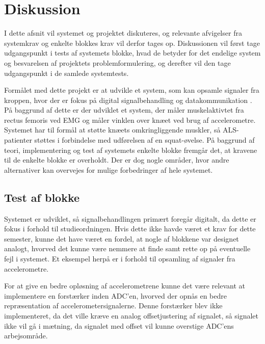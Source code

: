 \section{Diskussion} \label{sec:diskussion}
I dette afsnit vil systemet og projektet diskuteres, og relevante afvigelser fra systemkrav og enkelte blokkes krav vil derfor tages op. Diskussionen vil først tage udgangspunkt i tests af systemets blokke, hvad de betyder for det endelige system og besvarelsen af projektets problemformulering, og derefter vil den tage udgangspunkt i de samlede systemtests. 

Formålet med dette projekt er at udvikle et system, som kan opsamle signaler fra kroppen, hvor der er fokus på digital signalbehandling og datakommunikation \citep{aalborguniversitet2014}. På baggrund af dette er der udviklet et system, der måler muskelaktivtet fra rectus femoris ved EMG og måler vinklen over knæet ved brug af accelerometre. Systemet har til formål at støtte knæets omkringliggende muskler, så ALS-patienter støttes i forbindelse med udførelsen af en squat-øvelse. På baggrund af teori, implementering og test af systemets enkelte blokke fremgår det, at kravene til de enkelte blokke er overholdt. Der er dog nogle områder, hvor andre alternativer kan overvejes for mulige forbedringer af hele systemet. 

\subsection{Test af blokke}
Systemet er udviklet, så signalbehandlingen primært foregår digitalt, da dette er fokus i forhold til studieordningen. Hvis dette ikke havde været et krav for dette semester, kunne det have været en fordel, at nogle af blokkene var designet analogt, hvorved det kunne være nemmere at finde samt rette op på eventuelle fejl i systemet. Et eksempel herpå er i forhold til opsamling af signaler fra accelerometre. 

For at give en bedre opløsning af accelerometrene kunne det være relevant at implementere en forstærker inden ADC'en, hvorved der opnås en bedre repræsentation af accelerometersignalerne. Denne forstærker blev ikke implementeret, da det ville kræve en analog offsetjustering af signalet, så signalet ikke vil gå i mætning, da signalet med offset vil kunne overstige ADC'ens arbejsområde. %

